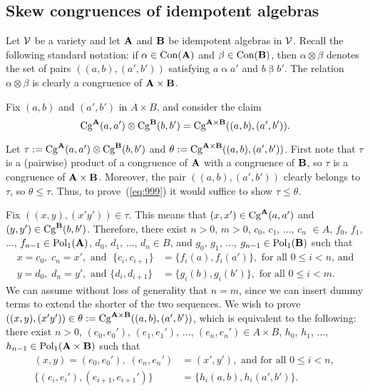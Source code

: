 \bigskip

\subsection{Skew congruences of idempotent algebras}
Let $\mathcal{V}$ be a variety and let $\mathbf{A}$ and $\mathbf{B}$ be idempotent
algebras in $\mathcal{V}$.
Recall the following standard notation:
if $\alpha \in \operatorname{Con}(\mathbf{A})$ and $\beta \in \operatorname{Con}(\mathbf{B})$, then
$\alpha \otimes \beta$ denotes the set of pairs $((a,b),(a',b'))$ satisfying
$a \mathrel{\alpha} a'$ and $b \mathrel{\beta} b'$.  The relation 
$\alpha \otimes \beta$ is clearly a congruence of $\mathbf{A} \times \mathbf{B}$.

Fix $(a, b)$ and $(a', b')$ in $A \times B$, and consider the claim 
\begin{equation}
  \label{eq:999}
\operatorname{Cg}^{\mathbf{A}}(a,a') \otimes \operatorname{Cg}^{\mathbf{B}}(b,b')
=\operatorname{Cg}^{\mathbf{A} \times \mathbf{B}}((a, b), (a', b')).
\end{equation}

Let $\tau := \operatorname{Cg}^{\mathbf{A}}(a,a') \otimes \operatorname{Cg}^{\mathbf{B}}(b,b')$  %
and $\theta:= \operatorname{Cg}^{\mathbf{A} \times \mathbf{B}}((a, b), (a', b'))$.
First note that $\tau$ is a (pairwise) product of a congruence
of $\mathbf{A}$ with a congruence of $\mathbf{B}$, so $\tau$ is a congruence of $\mathbf{A}\times \mathbf{B}$.
Moreover, the pair $((a,b), (a',b'))$ clearly belongs to $\tau$, so
$\theta\leq \tau$.  Thus, to prove~(\ref{eq:999}) it would suffice to show $\tau \leq \theta$.

Fix $((x,y),(x'y')) \in \tau$. This means that
$(x,x') \in \operatorname{Cg}^{\mathbf{A}}(a,a')$ and $(y,y')\in \operatorname{Cg}^{\mathbf{B}}(b,b')$.
Therefore, there exist $n>0$, $m>0$, 
$c_0$, $c_1$, $\dots$, $c_n$ $\in A$, $f_0$, $f_1$, $\dots$,
$f_{n-1} \in \operatorname{Pol}_1(\mathbf{A})$, $d_0$, $d_1$, $\dots$, $d_n\in B$, and $g_0$, $g_1$, $\dots$,
$g_{n-1} \in \operatorname{Pol}_1(\mathbf{B})$ such that 
\begin{align*}
  x = c_0, \; c_n=x', \text{ and } \; \{c_i, c_{i+1}\} &= \{f_i(a), f_i(a')\},
  \text{ for all $0\leq i < n$, and}\\
  y = d_0, \; d_n=y',  \text{ and }  
  \{d_i, d_{i+1}\} &= \{g_i(b), g_i(b')\}, \text{ for all $0\leq i < m$.}
\end{align*}
We can assume without loss of generality that $n=m$, since we can insert dummy
terms to extend the shorter of the two sequences.
We wish to prove $((x,y),(x'y')) \in \theta:= \operatorname{Cg}^{\mathbf{A} \times \mathbf{B}}((a, b), (a', b'))$,
which is equivalent to the following: there exist $n>0$, 
$(e_0, e_0')$, $(e_1,e_1')$, $\dots$, $(e_n, e_n') \in A\times B$, 
$h_0$, $h_1$, $\dots$, $h_{n-1} \in \operatorname{Pol}_1(\mathbf{A}\times \mathbf{B})$ such that
\begin{align*}
  (x,y) = (e_0,e_0'), \; (e_n, e_n') &=(x',y'), \text{ and for all $0\leq i < n$, } \\
  \{(e_i, e_i'), (e_{i+1}, e_{i+1}')\} &= \{h_i(a,b), h_i(a',b')\}.
\end{align*}


